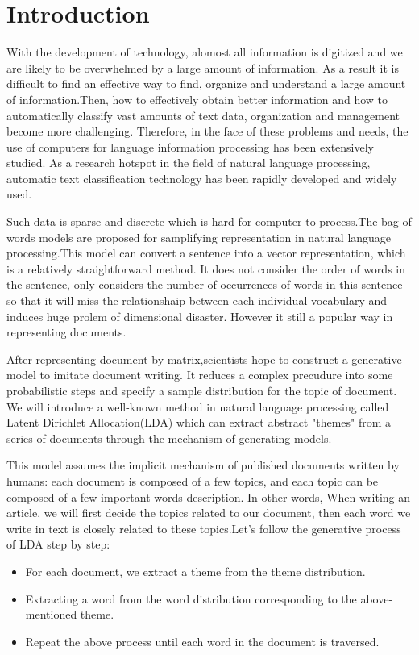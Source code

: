 \afterpage{\blankpage}

\chapter{Introduction}\label{s-intro}


With the development of technology, alomost all information is digitized and we are  likely to be overwhelmed by a large amount of information. As a result it is difficult to find an effective way to find, organize and understand a large amount of information{\cite{intro-back}}.Then, how to effectively obtain better information and how to automatically classify vast amounts of text data, organization and management become more challenging. Therefore, in the face of these problems and needs, the use of computers for language information processing has been extensively studied. As a research hotspot in the field of natural language processing, automatic text classification technology has been rapidly developed and widely used.


Such data is sparse and discrete which is hard for computer to process.The bag of words models are proposed for samplifying representation in natural language processing.This model can convert a sentence into a vector representation, which is a relatively straightforward method. It does not consider the order of words in the sentence, only considers the number of occurrences of words  in this sentence so that it will miss the relationshaip between each individual vocabulary and induces huge prolem of dimensional disaster. However it still a popular way in representing documents.

After representing document by matrix,scientists hope to construct a generative model to
imitate document writing. It reduces a complex precudure into some probabilistic steps and specify a sample  distribution for the topic of  document\cite{find}. We will introduce  a  well-known method in natural language processing called Latent Dirichlet Allocation(LDA) which can extract  abstract "themes"  from a series of documents through the mechanism of generating models.


This model assumes the implicit mechanism of published documents written by humans: each document is composed of a few topics, and each topic can be composed of a few important words description. In other words, When writing an article, we will first decide the topics related to our document, then each word we write in text is closely related to these topics.Let's follow the generative process of LDA step by step:
\begin{itemize}
  \item For each document, we extract a theme from the theme distribution.
  \item Extracting a word from the word distribution corresponding to the above-mentioned theme.
  \item Repeat the above process until each word in the document is traversed.
\end{itemize}


